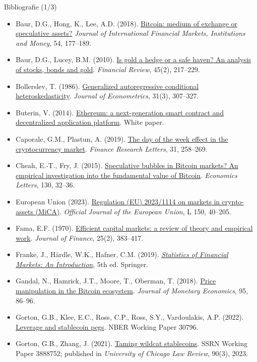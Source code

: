 \begin{frame}{Bibliografie (1/3)}
\itemsize{\tiny}
\begin{itemize}
    \item Baur, D.G., Hong, K., Lee, A.D. (2018). \href{https://doi.org/10.1016/j.intfin.2017.12.004}{Bitcoin: medium of exchange or speculative assets?} \textit{Journal of International Financial Markets, Institutions and Money}, 54, 177--189.
    \item Baur, D.G., Lucey, B.M. (2010). \href{https://doi.org/10.1111/j.1540-6288.2010.00244.x}{Is gold a hedge or a safe haven? An analysis of stocks, bonds and gold}. \textit{Financial Review}, 45(2), 217--229.
    \item Bollerslev, T. (1986). \href{https://doi.org/10.1016/0304-4076(86)90063-1}{Generalized autoregressive conditional heteroskedasticity}. \textit{Journal of Econometrics}, 31(3), 307--327.
    \item Buterin, V. (2014). \href{https://ethereum.org/en/whitepaper/}{Ethereum: a next-generation smart contract and decentralized application platform}. White paper.
    \item Caporale, G.M., Plastun, A. (2019). \href{https://doi.org/10.1016/j.frl.2018.11.012}{The day of the week effect in the cryptocurrency market}. \textit{Finance Research Letters}, 31, 258--269.
    \item Cheah, E.-T., Fry, J. (2015). \href{https://doi.org/10.1016/j.econlet.2015.02.029}{Speculative bubbles in Bitcoin markets? An empirical investigation into the fundamental value of Bitcoin}. \textit{Economics Letters}, 130, 32--36.
    \item European Union (2023). \href{https://eur-lex.europa.eu/eli/reg/2023/1114/oj}{Regulation (EU) 2023/1114 on markets in crypto-assets (MiCA)}. \textit{Official Journal of the European Union}, L 150, 40--205.
    \item Fama, E.F. (1970). \href{https://doi.org/10.2307/2325486}{Efficient capital markets: a review of theory and empirical work}. \textit{Journal of Finance}, 25(2), 383--417.
    \item Franke, J., Härdle, W.K., Hafner, C.M. (2019). \href{https://doi.org/10.1007/978-3-030-13751-9}{\textit{Statistics of Financial Markets: An Introduction}}, 5th ed. Springer.
    \item Gandal, N., Hamrick, J.T., Moore, T., Oberman, T. (2018). \href{https://doi.org/10.1016/j.jmoneco.2017.12.004}{Price manipulation in the Bitcoin ecosystem}. \textit{Journal of Monetary Economics}, 95, 86--96.
    \item Gorton, G.B., Klee, E.C., Ross, C.P., Ross, S.Y., Vardoulakis, A.P. (2022). \href{https://doi.org/10.3386/w30796}{Leverage and stablecoin pegs}. NBER Working Paper 30796.
    \item Gorton, G.B., Zhang, J. (2021). \href{https://doi.org/10.2139/ssrn.3888752}{Taming wildcat stablecoins}. SSRN Working Paper 3888752; published in \textit{University of Chicago Law Review}, 90(3), 2023.
\end{itemize}
\end{frame}

